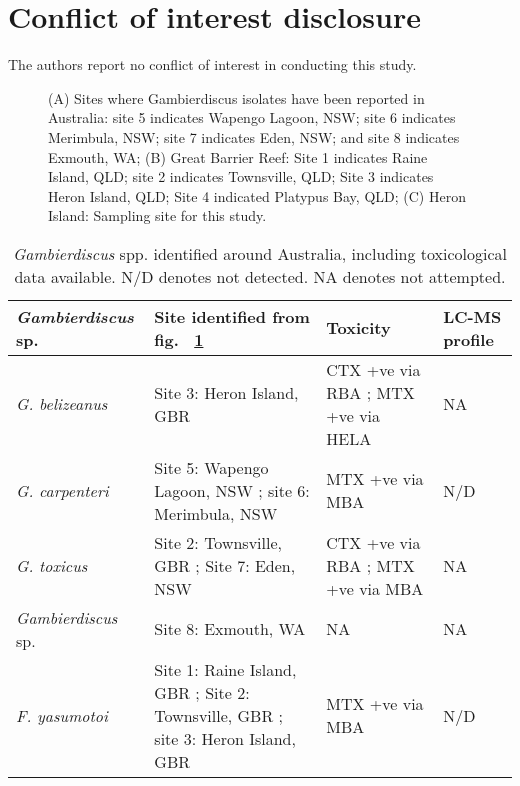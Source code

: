 \documentclass[12pt]{article}
\begin{document}
\section{Conflict of interest disclosure}
The authors report no conflict of interest in conducting this study.
\newpage

\begin{figure} 
\caption{(A) Sites where Gambierdiscus isolates have been reported in Australia: site 5 indicates Wapengo Lagoon, NSW; site 6 indicates Merimbula, NSW; site 7 indicates Eden, NSW; and site 8 indicates Exmouth, WA; (B) Great Barrier Reef:​ Site 1 indicates Raine Island, QLD; site 2 indicates Townsville, QLD; Site 3 indicates Heron Island, QLD; Site 4 indicated Platypus Bay, QLD; (C) Heron Island: Sampling site for this study.} 
\label{fig:OzSites}
\end{figure}
\begin{table}
\caption{\emph{Gambierdiscus} spp. identified around Australia, including toxicological data available. N/D denotes not detected. NA denotes not attempted.}
\label{tbl:OzTable}
\begin{tabular}{ | p{3.3cm} | p{4cm} | p{4.5cm} | p{2.3cm} | }
\hline
 \textbf{\emph{Gambierdiscus} sp.} & \textbf{Site identified from fig. ~\ref{fig:OzSites}} & \textbf{Toxicity}  & \textbf{LC-MS profile}  \\
 \hline
 \emph{G. belizeanus}  & Site 3: Heron Island, GBR \citep{murray2014molecular} & CTX +ve via RBA \citep{chinain2010growth}; MTX +ve via HELA \citep{holland2013differences} & NA  \\
 \hline
 \emph{G. carpenteri} &Site 5: Wapengo Lagoon, NSW \citep{kohli2014high}; site 6:  Merimbula, NSW  \citep{kohli2014high}& MTX +ve via MBA \citep{kohli2014high} & N/D \citep{kohli2014high}\\
 \hline
 \emph{G. toxicus} & Site 2: Townsville, GBR \citep{hallegraeff2010algae}; Site 7: Eden, NSW \citep{hallegraeff2010algae} & CTX +ve via RBA \citep{chinain2010growth}; MTX +ve via MBA \citep{chinain1999morphology} & NA \\
  \hline
  \emph{Gambierdiscus} sp. & Site 8: Exmouth, WA \citep{kohli2014cob}& NA & NA \\
  \hline
 \emph{F. yasumotoi}  & Site 1: Raine Island, GBR \citep{murray2014molecular}; Site 2: Townsville, GBR \citep{murray2014molecular}; site 3: Heron Island, GBR \citep{murray2014molecular}& MTX +ve via MBA \citep{holmes1998gambierdiscus} & N/D \citep{rhodes2014gambierdiscus}\\
  \hline
\end{tabular}
\end{table}
\end{document}
